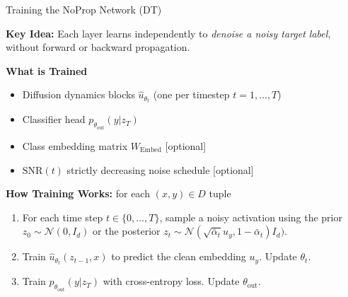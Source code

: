 \documentclass{beamer}
\begin{document}
\begin{frame}{Training the NoProp Network (DT)}

\textbf{Key Idea:}  
Each layer learns independently to \emph{denoise a noisy target label}, without forward or backward propagation.

\vspace{0.3cm}
\textbf{What is Trained}
\begin{itemize}
  \item Diffusion dynamics blocks $\hat u_{\theta_t}$ (one per timestep $t=1,\dots,T$)
  \item Classifier head $p_{\theta_{\text{out}}}(y|z_T)$
  \item Class embedding matrix $W_{\text{Embed}}$ [optional]
  \item $\text{SNR}(t)$ strictly decreasing noise schedule [optional]
\end{itemize}

\vspace{0.3cm}
\textbf{How Training Works:} for each $(x, y) \in D$ tuple
\begin{enumerate}
  \item For each time step $t \in \{0, \dots, T\}$, sample a noisy activation using the prior $z_{0} \sim \mathcal{N} (0, I_d)$ or the posterior $z_{t} \sim \mathcal{N} (\sqrt{\bar{\alpha}_t}u_y, 1-\bar{\alpha}_t)I_d)$.
  \item Train $\hat u_{\theta_t}(z_{t-1},x)$ to predict the clean embedding $u_y$. Update $\theta_t$.
  \item Train $p_{\theta_{\text{out}}}(y|z_T)$ with cross-entropy loss. Update $ \theta_{\text{out}}$.
\end{enumerate}

\end{frame}
\end{document}
